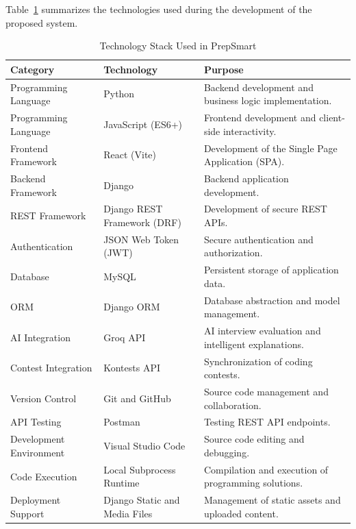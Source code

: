 Table~\ref{tab:technology_stack} summarizes the technologies used during the development of the proposed system.

\begin{table}[H]
\centering
\caption{Technology Stack Used in PrepSmart}
\label{tab:technology_stack}
\renewcommand{\arraystretch}{1.35}
\begin{tabular}{|p{4cm}|p{4cm}|p{7cm}|}
\hline
\textbf{Category} & \textbf{Technology} & \textbf{Purpose} \\
\hline

Programming Language & Python & Backend development and business logic implementation. \\
\hline

Programming Language & JavaScript (ES6+) & Frontend development and client-side interactivity. \\
\hline

Frontend Framework & React (Vite) & Development of the Single Page Application (SPA). \\
\hline

Backend Framework & Django & Backend application development. \\
\hline

REST Framework & Django REST Framework (DRF) & Development of secure REST APIs. \\
\hline

Authentication & JSON Web Token (JWT) & Secure authentication and authorization. \\
\hline

Database & MySQL & Persistent storage of application data. \\
\hline

ORM & Django ORM & Database abstraction and model management. \\
\hline

AI Integration & Groq API & AI interview evaluation and intelligent explanations. \\
\hline

Contest Integration & Kontests API & Synchronization of coding contests. \\
\hline

Version Control & Git and GitHub & Source code management and collaboration. \\
\hline

API Testing & Postman & Testing REST API endpoints. \\
\hline

Development Environment & Visual Studio Code & Source code editing and debugging. \\
\hline

Code Execution & Local Subprocess Runtime & Compilation and execution of programming solutions. \\
\hline

Deployment Support & Django Static and Media Files & Management of static assets and uploaded content. \\
\hline

\end{tabular}
\end{table}

